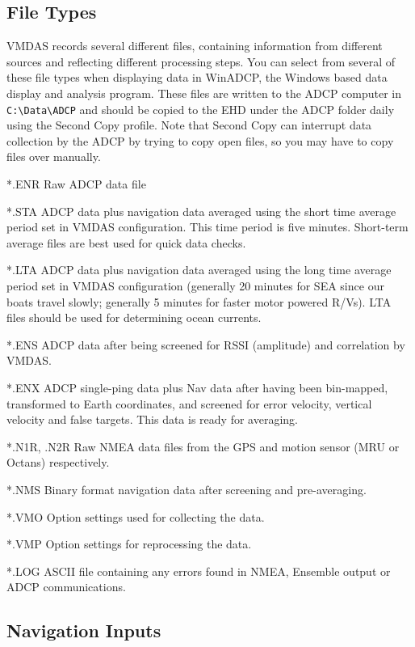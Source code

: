\documentclass[]{book}
\theoremstyle{definition}
\theoremstyle{definition}
\theoremstyle{definition}
\theoremstyle{remark}
\begin{document}
\subsection{File Types}\label{file-types}

VMDAS records several different files, containing information from
different sources and reflecting different processing steps. You can
select from several of these file types when displaying data in WinADCP,
the Windows based data display and analysis program. These files are
written to the ADCP computer in
\texttt{C:\textbackslash{}Data\textbackslash{}ADCP} and should be copied
to the EHD under the ADCP folder daily using the Second Copy profile.
Note that Second Copy can interrupt data collection by the ADCP by
trying to copy open files, so you may have to copy files over manually.

*.ENR Raw ADCP data file

*.STA ADCP data plus navigation data averaged using the short time
average period set in VMDAS configuration. This time period is five
minutes. Short-term average files are best used for quick data checks.

*.LTA ADCP data plus navigation data averaged using the long time
average period set in VMDAS configuration (generally 20 minutes for SEA
since our boats travel slowly; generally 5 minutes for faster motor
powered R/Vs). LTA files should be used for determining ocean currents.

*.ENS ADCP data after being screened for RSSI (amplitude) and
correlation by VMDAS.

*.ENX ADCP single-ping data plus Nav data after having been bin-mapped,
transformed to Earth coordinates, and screened for error velocity,
vertical velocity and false targets. This data is ready for averaging.

*.N1R, .N2R Raw NMEA data files from the GPS and motion sensor (MRU or
Octans) respectively.

*.NMS Binary format navigation data after screening and pre-averaging.

*.VMO Option settings used for collecting the data.

*.VMP Option settings for reprocessing the data.

*.LOG ASCII file containing any errors found in NMEA, Ensemble output or
ADCP communications.

\subsection{Navigation Inputs}\label{navigation-inputs}
\end{document}
